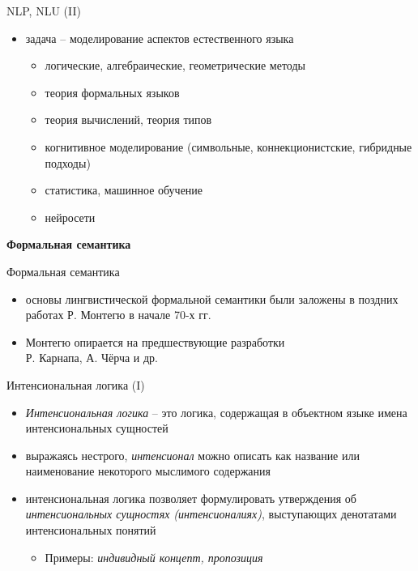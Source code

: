 \documentclass{beamer}
\begin{document}
\begin{frame}{NLP, NLU (II)}
\begin{small}
\begin{itemize}
    \item задача -- моделирование аспектов естественного языка
    \begin{itemize}
        \item логические, алгебраические, геометрические методы
        \item теория формальных языков
        \item теория вычислений, теория типов
        \item когнитивное моделирование (символьные, коннекционистские, гибридные подходы)
        \item статистика, машинное обучение
        \item нейросети
    \end{itemize}    
\end{itemize}
\end{small}
\end{frame}

\begin{frame}{}
\thispagestyle{empty}
\begin{center}
	\textbf{Формальная семантика}
\end{center}
\end{frame}

\begin{frame}{Формальная семантика}
\begin{small}
\begin{itemize}
	\item основы лингвистической формальной семантики были заложены в поздних работах Р. Монтегю в начале 70-х гг.
	\item Монтегю опирается на предшествующие разработки\\ Р. Карнапа, А. Чёрча и др.
\end{itemize}
\end{small}
\end{frame}

\begin{frame}{Интенсиональная логика (I)}
\begin{itemize}
	\item \textit{Интенсиональная логика} -- это логика, содержащая в объектном языке имена интенсиональных сущностей
	\medskip
	\item выражаясь нестрого, \textit{интенсионал} можно описать как название или наименование некоторого мыслимого содержания
	\medskip
	\item интенсиональная логика позволяет формулировать утверждения об \textit{интенсиональных сущностях (интенсионалиях)}, выступающих денотатами интенсиональных понятий
	    \medskip
	    {\small
	    \begin{itemize}
	        \item Примеры: \textit{индивидный концепт, пропозиция}
	    \end{itemize}
	    }
\end{itemize}
\end{frame}
\end{document}
